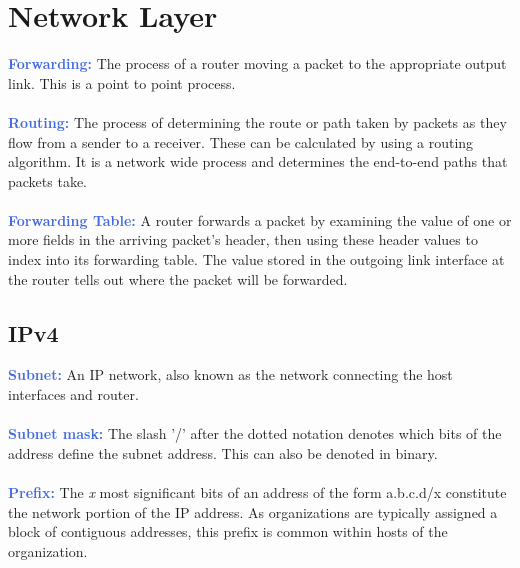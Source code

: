 \documentclass[]{article}
\begin{document}
\section{Network Layer}
\textcolor{RoyalBlue}{\textbf{Forwarding:}} The process of a router moving a packet to the appropriate output link. This is a point to point process. \\\\
\textcolor{RoyalBlue}{\textbf{Routing:}} The process of determining the route or path taken by packets as they flow from a sender to a receiver. These can be calculated by using a routing algorithm. It is a network wide process and determines the end-to-end paths that packets take.\\\\
\textcolor{RoyalBlue}{\textbf{Forwarding Table:}} A router forwards a packet by examining the value of one or more fields in the arriving packet's header, then using these header values to index into its forwarding table. The value stored in the outgoing link interface at the router tells out where the packet will be forwarded.
\subsection{IPv4}
\textcolor{RoyalBlue}{\textbf{Subnet:}} An IP network, also known as the network connecting the host interfaces and router. \\\\ 
\textcolor{RoyalBlue}{\textbf{Subnet mask:}} The slash '/' after the dotted notation denotes which bits of the address define the subnet address. This can also be denoted in binary. \\\\
\textcolor{RoyalBlue}{\textbf{Prefix:}} The \emph{x} most significant bits of an address of the form a.b.c.d/x constitute the network portion of the IP address. As organizations are typically assigned a block of contiguous addresses, this prefix is common within hosts of the organization. 
\end{document}
